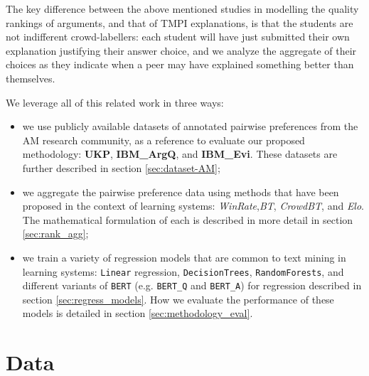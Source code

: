 \documentclass[notitlepage,12pt]{jedm}
\begin{document}
The key difference between the above mentioned studies in modelling the quality 
rankings of arguments, and that of TMPI explanations, is that the students are 
not indifferent crowd-labellers: each student will have just submitted their 
own explanation justifying their answer choice, and we analyze the aggregate of 
their choices as they indicate when a peer may have explained something better 
than themselves.

We leverage all of this related work in three ways:
\begin{itemize}
	\item we use publicly available datasets of annotated pairwise preferences 
	from the AM research community, as a reference to evaluate our proposed 
	methodology: \textbf{UKP}, \textbf{IBM\_ArgQ}, and \textbf{IBM\_Evi}. 
	These datasets are further described in section \ref{sec:dataset-AM};
	\item we aggregate the pairwise preference data using methods that have 
	been proposed in the context of learning systems: 
	\textit{WinRate},\textit{BT}, \textit{CrowdBT}, and \textit{Elo}.
	The mathematical formulation of each is described in more detail in section 
	\ref{sec:rank_agg};
	\item we train a variety of regression models that are common to text 
	mining in learning systems: \verb|Linear| regression, \verb|DecisionTrees|, 
	\verb|RandomForests|, and different variants of \verb|BERT| (e.g. 
	\verb|BERT_Q| and \verb|BERT_A|) for regression described in section 
	\ref{sec:regress_models}. 
	How we evaluate the performance of these models is detailed in section 
	\ref{sec:methodology_eval}.
\end{itemize}


\section{Data}\label{sec:datasets}
\end{document}

